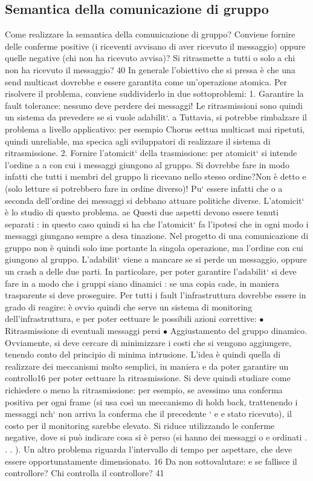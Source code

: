 \subsection{Semantica della comunicazione di gruppo}
Come realizzare la semantica della comunicazione di gruppo? Conviene fornire
delle conferme positive (i riceventi avvisano di aver ricevuto il messaggio) oppure
quelle negative (chi non ha ricevuto avvisa)? Si ritrasmette a tutti o solo a chi
non ha ricevuto il messaggio?
40
In generale l'obiettivo che si pressa è che una send multicast dovrebbe
e
essere garantita come un'operazione atomica. Per risolvere il problema, conviene
suddividerlo in due sottoproblemi:
1. Garantire la fault tolerance: nessuno deve perdere dei messaggi! Le ritrasmissioni sono quindi un sistema da
prevedere se si vuole adabilit`.
a
Tuttavia, si potrebbe rimbalzare il problema a livello applicativo: per
esempio Chorus eettua multicast mai ripetuti, quindi unreliable, ma
specica agli sviluppatori di realizzare il sistema di ritrasmissione.
2. Fornire l'atomicit` della trasmissione: per atomicit` si intende l'ordine
a
a
con cui i messaggi giungono al gruppo. Si dovrebbe fare in modo infatti
che tutti i membri del gruppo li ricevano nello stesso ordine?Non è detto
e
(solo letture si potrebbero fare in ordine diverso)! Pu` essere infatti che
o
a seconda dell'ordine dei messaggi si debbano attuare politiche diverse.
L'atomicit` è lo studio di questo problema.
ae
Questi due aspetti devono essere tenuti separati : in questo caso quindi si ha
che l'atomicit` fa l'ipotesi che in ogni modo i messaggi giungano sempre a desa
tinazione. Nel progetto di una comunicazione di gruppo non è quindi solo ime
portante la singola operazione, ma l'ordine con cui giungono al gruppo.
L'adabilit` viene a mancare se si perde un messaggio, oppure un crash
a
delle due parti. In particolare, per poter garantire l'adabilit` si deve fare in
a
modo che i gruppi siano dinamici : se una copia cade, in maniera trasparente
si deve proseguire. Per tutti i fault l'infrastruttura dovrebbe essere in grado di
reagire: è ovvio quindi che serve un sistema di monitoring dell'infrastruttura,
e
per poter eettuare le possibili azioni correttive:
$\bullet$ Ritrasmissione di eventuali messaggi persi
$\bullet$ Aggiustamento del gruppo dinamico.
Ovviamente, si deve cercare di minimizzare i costi che si vengono aggiungere,
tenendo conto del principio di minima intrusione.
L'idea è quindi quella di realizzare dei meccanismi molto semplici, in maniera
e
da poter garantire un controllo16 per poter eettuare la ritrasmissione. Si deve
quindi studiare come richiedere o meno la ritrasmissione: per esempio, se avessimo una conferma positiva per ogni frame
(si usa così un meccanismo di hold\i{}
back, trattenendo i messaggi nch` non arriva la conferma che il precedente `
e
e
stato ricevuto), il costo per il monitoring sarebbe elevato. Si riduce utilizzando
le conferme negative, dove si può indicare cosa si è perso (si hanno dei messaggi
o
e
ordinati . . . ). Un altro problema riguarda l'intervallo di tempo per aspettare,
che deve essere opportunatamente dimensionato.
16 Da
non sottovalutare: e se fallisce il controllore? Chi controlla il controllore?
41
